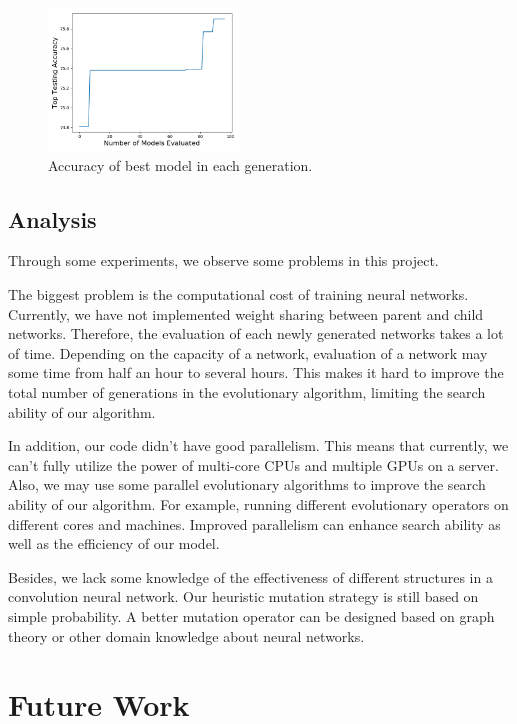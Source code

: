\documentclass[conference]{IEEEtran}
\begin{document}
\begin{figure}[H]
    \centering
    \includegraphics[width=0.45\textwidth]{figures/result_curve.png}
    \caption{Accuracy of best model in each generation.}\label{fig:digit}
    \label{curve}
\end{figure}

\subsection{Analysis}
Through some experiments, we observe some problems in this project.

The biggest problem is the computational cost of training neural networks. Currently, we have not implemented weight sharing between parent and child networks. Therefore, the evaluation of each newly generated networks takes a lot of time. Depending on the capacity of a network, evaluation of a network may some time from half an hour to several hours. This makes it hard to improve the total number of generations in the evolutionary algorithm, limiting the search ability of our algorithm.

In addition, our code didn't have good parallelism. This means that currently, we can't fully utilize the power of multi-core CPUs and multiple GPUs on a server. Also, we may use some parallel evolutionary algorithms to improve the search ability of our algorithm. For example, running different evolutionary operators on different cores and machines. Improved parallelism can enhance search ability as well as the efficiency of our model.

Besides, we lack some knowledge of the effectiveness of different structures in a convolution neural network. Our heuristic mutation strategy is still based on simple probability. A better mutation operator can be designed based on graph theory or other domain knowledge about neural networks.



\section{Future Work}  
\end{document}
